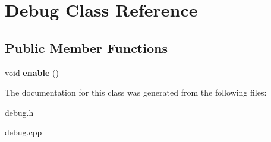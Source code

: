 \hypertarget{classDebug}{}\section{Debug Class Reference}
\label{classDebug}
\subsection*{Public Member Functions}
\begin{DoxyCompactItemize}
\item 
\mbox{\label{classDebug_a031be1f7b4f0a470ebcd2d10c45fcd93}} 
void {\bfseries enable} ()
\end{DoxyCompactItemize}


The documentation for this class was generated from the following files\+:\begin{DoxyCompactItemize}
\item 
debug.\+h\item 
debug.\+cpp\end{DoxyCompactItemize}
